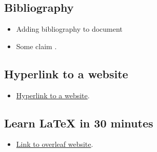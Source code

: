 \subsection{Bibliography}
\begin{itemize}
    \item Adding bibliography to document
	\item Some claim \cite{gratzer2007more}.
\end{itemize}

\subsection{Hyperlink to a website}
\begin{itemize}
    \item \href{https://www.overleaf.com/latex/templates/a-quick-guide-to-latex/fghqpfgnxggz}{Hyperlink to a website}.
\end{itemize}



\subsection{Learn LaTeX in 30 minutes}
\begin{itemize}
    \item \href{https://www.overleaf.com/learn/latex/Learn_LaTeX_in_30_minutes}{Link to overleaf website}.
\end{itemize}

